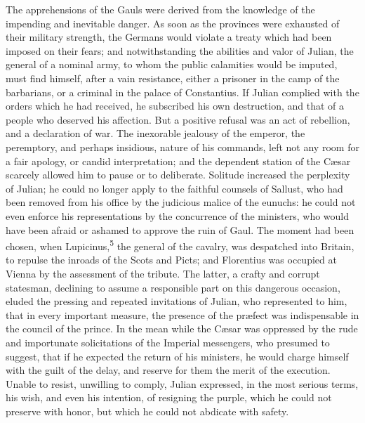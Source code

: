 The apprehensions of the Gauls were derived from the knowledge of
the impending and inevitable danger. As soon as the provinces
were exhausted of their military strength, the Germans would
violate a treaty which had been imposed on their fears; and
notwithstanding the abilities and valor of Julian, the general of
a nominal army, to whom the public calamities would be imputed,
must find himself, after a vain resistance, either a prisoner in
the camp of the barbarians, or a criminal in the palace of
Constantius. If Julian complied with the orders which he had
received, he subscribed his own destruction, and that of a people
who deserved his affection. But a positive refusal was an act of
rebellion, and a declaration of war. The inexorable jealousy of
the emperor, the peremptory, and perhaps insidious, nature of his
commands, left not any room for a fair apology, or candid
interpretation; and the dependent station of the Cæsar scarcely
allowed him to pause or to deliberate. Solitude increased the
perplexity of Julian; he could no longer apply to the faithful
counsels of Sallust, who had been removed from his office by the
judicious malice of the eunuchs: he could not even enforce his
representations by the concurrence of the ministers, who would
have been afraid or ashamed to approve the ruin of Gaul. The
moment had been chosen, when Lupicinus,\textsuperscript{5} the general of the
cavalry, was despatched into Britain, to repulse the inroads of
the Scots and Picts; and Florentius was occupied at Vienna by the
assessment of the tribute. The latter, a crafty and corrupt
statesman, declining to assume a responsible part on this
dangerous occasion, eluded the pressing and repeated invitations
of Julian, who represented to him, that in every important
measure, the presence of the præfect was indispensable in the
council of the prince. In the mean while the Cæsar was oppressed
by the rude and importunate solicitations of the Imperial
messengers, who presumed to suggest, that if he expected the
return of his ministers, he would charge himself with the guilt
of the delay, and reserve for them the merit of the execution.
Unable to resist, unwilling to comply, Julian expressed, in the
most serious terms, his wish, and even his intention, of
resigning the purple, which he could not preserve with honor, but
which he could not abdicate with safety.


